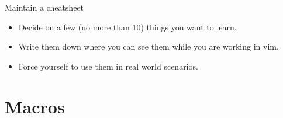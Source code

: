 \documentclass{beamer}
\begin{document}
    \begin{frame}{Maintain a cheatsheet}
        \begin{itemize}
            \item <alert@+> Decide on a few (no more than 10) things you want to learn.
            \item <alert@+> Write them down where you can see them while you are working in vim.
            \item <alert@+> Force yourself to use them in real world scenarios.
        \end{itemize}
    \end{frame}
    \section{Macros}
\end{document}
